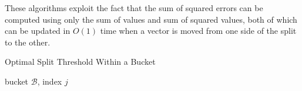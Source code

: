 These algorithms exploit the fact that the sum of squared errors can be computed using only the sum of values and sum of squared values, both of which can be updated in $O(1)$ time when a vector is moved from one side of the split to the other.


\begin{algorithm}[h]
\caption{Optimal Split Threshold Within a Bucket} \label{algo:optimalSplitVal}
\begin{algorithmic}[1]
     bucket $\mathcal{B}$, index $j$

\end{algorithmic}
\end{algorithm}



